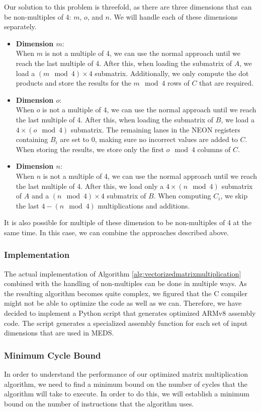 \documentclass[11pt,a4paper]{report}
\theoremstyle{definition}
\begin{document}
Our solution to this problem is threefold, as there are three dimensions that can be non-multiples of 4: $m$, $o$, and $n$. We will handle each of these dimensions separately.
\begin{itemize}
  \item \textbf{Dimension $m$}:\\
  When $m$ is not a multiple of 4, we can use the normal approach until we reach the last multiple of 4. After this, when loading the submatrix of $A$, we load a $(m \mod 4) \times 4$ submatrix. Additionally, we only compute the dot products and store the results for the $m \mod 4$ rows of $C$ that are required.
  \item \textbf{Dimension $o$}:\\
  When $o$ is not a multiple of 4, we can use the normal approach until we reach the last multiple of 4. After this, when loading the submatrix of $B$, we load a $4 \times (o \mod 4)$ submatrix. The remaining lanes in the NEON registers containing $B_i$ are set to 0, making sure no incorrect values are added to $C$. When storing the results, we store only the first $o \mod 4$ columns of $C$.
  \item \textbf{Dimension $n$}:\\
  When $n$ is not a multiple of 4, we can use the normal approach until we reach the last multiple of 4. After this, we load only a $4 \times (n \mod 4)$ submatrix of $A$ and a $(n \mod 4) \times 4$ submatrix of $B$. When computing $C_i$, we skip the last $4 - (n \mod 4)$ multiplications and additions.
\end{itemize}
It is also possible for multiple of these dimension to be non-multiples of 4 at the same time. In this case, we can combine the approaches described above.

\subsubsection{Implementation}
The actual implementation of Algorithm \ref{alg:vectorizedmatrixmultiplication} combined with the handling of non-multiples can be done in multiple ways. As the resulting algorithm becomes quite complex, we figured that the C compiler might not be able to optimize the code as well as we can. Therefore, we have decided to implement a Python script that generates optimized ARMv8 assembly code. The script generates a specialized assembly function for each set of input dimensions that are used in MEDS.

\subsubsection{Minimum Cycle Bound}
In order to understand the performance of our optimized matrix multiplication algorithm, we need to find a minimum bound on the number of cycles that the algorithm will take to execute. In order to do this, we will establish a minimum bound on the number of instructions that the algorithm uses.
\end{document}
